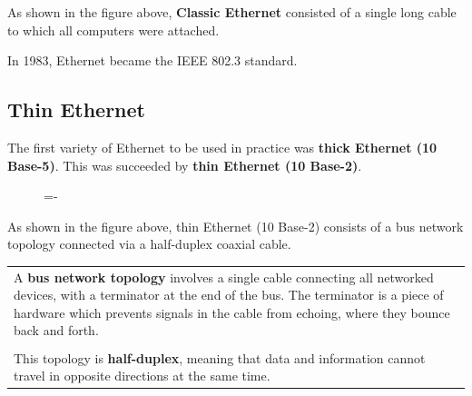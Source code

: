 \documentclass[a4paper]{systems-software}
\begin{document}
As shown in the figure above, \textbf{Classic Ethernet} consisted of a single long cable to which all computers were attached.

In 1983, Ethernet became the IEEE 802.3 standard.


\subsection*{Thin Ethernet}

The first variety of Ethernet to be used in practice was \textbf{thick Ethernet (10 Base-5)}. This was succeeded by \textbf{thin Ethernet (10 Base-2)}.

\begin{figure}[H]
	\lineskip=-\fboxrule
\end{figure}

As shown in the figure above, thin Ethernet (10 Base-2) consists of a bus network topology connected via a half-duplex coaxial cable.

\begin{longtabu} to \textwidth {| X[1,l] |}
	\hline
	A \textbf{bus network topology} involves a single cable connecting all networked devices, with a terminator at the end of the bus. The terminator is a piece of hardware which prevents signals in the cable from echoing, where they bounce back and forth. \\ \\
	
	This topology is \textbf{half-duplex}, meaning that data and information cannot travel in opposite directions at the same time. \\
	\hline
\end{longtabu}
\end{document}
